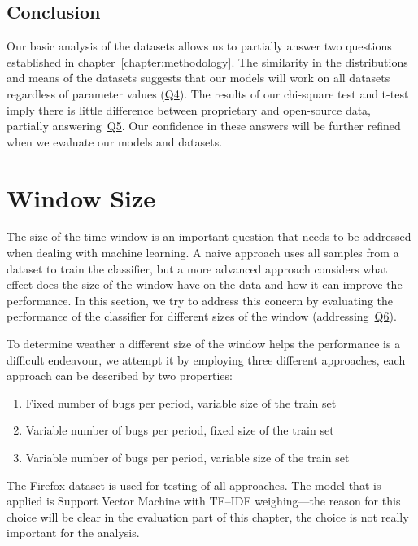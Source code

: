 \subsection{Conclusion}

Our basic analysis of the datasets allows us to partially answer two questions established in chapter~\ref{chapter:methodology}. The similarity in the distributions and means of the datasets suggests that our models will work on all datasets regardless of parameter values (\hyperlink{question:4}{Q4}). The results of our chi-square test and t-test imply there is little difference between proprietary and open-source data, partially answering~\hyperlink{question:5}{Q5}. Our confidence in these answers will be further refined when we evaluate our models and datasets.

\section{Window Size}
\label{section:window-size}

The size of the time window is an important question that needs to be addressed when dealing with machine learning. A naive approach uses all samples from a dataset to train the classifier, but a more advanced approach considers what effect does the size of the window have on the data and how it can improve the performance. In this section, we try to address this concern by evaluating the performance of the classifier for different sizes of the window (addressing~\hyperlink{question:6}{Q6}).

To determine weather a different size of the window helps the performance is a difficult endeavour, we attempt it by employing three different approaches, each approach can be described by two properties:

\begin{enumerate}
 \item Fixed number of bugs per period, variable size of the train set
 \item Variable number of bugs per period, fixed size of the train set
 \item Variable number of bugs per period, variable size of the train set
\end{enumerate}

The Firefox dataset is used for testing of all approaches. The model that is applied is Support Vector Machine with TF--IDF weighing---the reason for this choice will be clear in the evaluation part of this chapter, the choice is not really important for the analysis.

